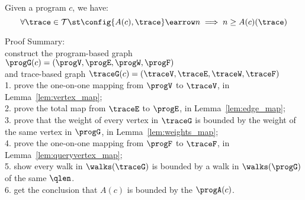   \begin{thm}
    \label{thm:adaptfun_soundness}
  Given a program ${c}$, we have:
  \[
    \forall \trace \in \mathcal{T} \st 
    \config{A(c), \trace} \earrow n \implies n \geq A(c)(\trace)
  \]
  \end{thm}
Proof Summary:
\\
construct the
program-based graph $\progG({c}) = (\progV, \progE, \progW, \progF)$
\\
and trace-based graph $\traceG({c}) = (\traceV, \traceE, \traceW, \traceF)$ 
\\
1. prove the one-on-one mapping from $\progV$ to $\traceV$, in Lemma~\ref{lem:vertex_map};
\\
2. prove the total map from $\traceE$ to $\progE$, in Lemma~\ref{lem:edge_map};
\\
3. prove that the weight of every vertex in $\traceG$ is bounded by the weight of the same vertex in $\progG$, in 
Lemma~\ref{lem:weights_map};
\\
4. prove the one-on-one mapping from $\progF$ to $\traceF$, in Lemma~\ref{lem:queryvertex_map};
\\
5. show every walk in $\walks(\traceG)$ is bounded by a walk in $\walks(\progG)$ of the same $\qlen$.
\\
6. get the conclusion that $A(c)$ is bounded by 
the $\progA(c)$.
%
